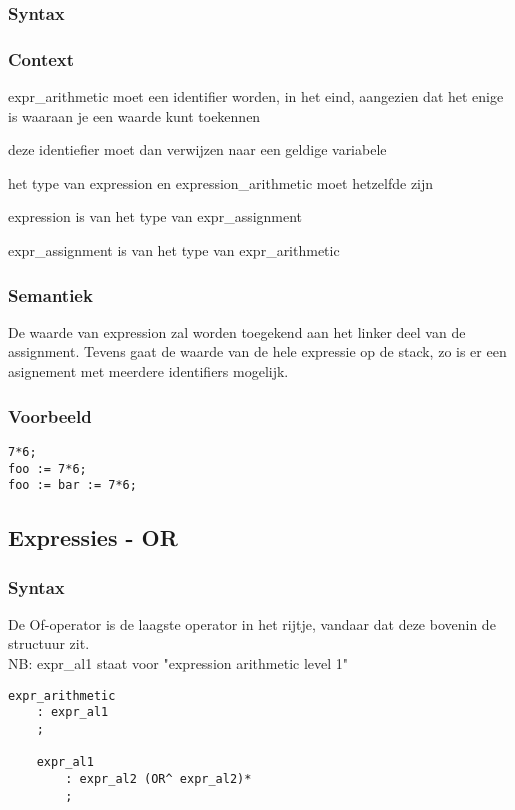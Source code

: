 \documentclass[]{article}
\begin{document}
\subsubsection{Syntax}

\subsubsection{Context}
\begin{list}{•}{•}
\item expr\_arithmetic moet een identifier worden, in het eind, aangezien dat het enige is waaraan je een waarde kunt toekennen
\item deze identiefier moet dan verwijzen naar een geldige variabele
\item het type van expression en expression\_arithmetic moet hetzelfde zijn
\item expression is van het type van expr\_assignment
\item expr\_assignment is van het type van expr\_arithmetic 
\end{list}
\subsubsection{Semantiek}
De waarde van expression zal worden toegekend aan het linker deel van de assignment.
Tevens gaat de waarde van de hele expressie op de stack, zo is er een asignement met meerdere identifiers mogelijk.
\subsubsection{Voorbeeld}
\begin{lstlisting}[style=SELMA]
7*6;
foo := 7*6;
foo := bar := 7*6;
\end{lstlisting}

\subsection{Expressies - OR}
\subsubsection{Syntax}
De Of-operator is de laagste operator in het rijtje, vandaar dat deze bovenin de structuur zit.
\\
NB: expr\_al1 staat voor "expression arithmetic level 1"
\begin{lstlisting}[style=ANTLR]
expr_arithmetic
	: expr_al1
	;

	expr_al1
		: expr_al2 (OR^ expr_al2)*
		;
\end{lstlisting}
\end{document}
